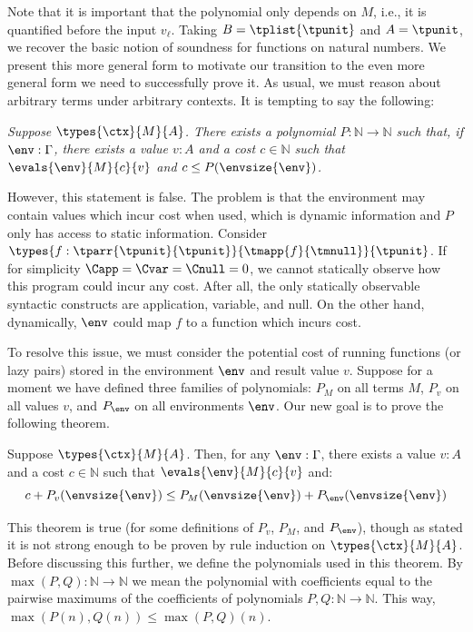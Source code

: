 Note that it is important that the polynomial only depends on $M$, i.e., it is quantified before the input $v_\ell$. Taking $B = \tplist{\tpunit}$ and $A = \tpunit$, we recover the basic notion of soundness for \lfplplus functions on natural numbers. We present this more general form to motivate our transition to the even more general form we need to successfully prove it. As usual, we must reason about arbitrary terms under arbitrary contexts. It is tempting to say the following:
\begin{center}
\parbox{.9\linewidth}{
  \it
Suppose $\types{\ctx}{M}{A}$. There exists a polynomial $P : \mathbb N \to \mathbb N$ such that, if $\env : \Gamma$, there exists a value $v : A$ and a cost $c \in \mathbb N$ such that $\evals{\env}{M}{c}{v}$ and $c \le P(\envsize{\env})$.
}
\end{center}
However, this statement is false. The problem is that the environment may contain values which incur cost when used, which is dynamic information and $P$ only has access to static information. Consider $\types{f : \tparr{\tpunit}{\tpunit}}{\tmapp{f}{\tmnull}}{\tpunit}$. If for simplicity $\Capp = \Cvar = \Cnull = 0$, we cannot statically observe how this program could incur any cost. After all, the only statically observable syntactic constructs are application, variable, and null. On the other hand, dynamically, $\env$ could map $f$ to a function which incurs cost.

To resolve this issue, we must consider the potential cost of running functions (or lazy pairs) stored in the environment $\env$ and result value $v$. Suppose for a moment we have defined three families of polynomials: $P_M$ on all terms $M$, $P_v$ on all values $v$, and $P_\env$ on all environments $\env$. Our new goal is to prove the following theorem.

\begin{theorem}
\label{thm:soundness-general}
Suppose $\types{\ctx}{M}{A}$. Then, for any $\env : \Gamma$, there exists a value $v : A$ and a cost $c \in \mathbb N$ such that $\evals{\env}{M}{c}{v}$ and:
\[ c + P_v(\envsize{\env}) \le P_M(\envsize{\env}) + P_{\env}(\envsize{\env}) \]
\end{theorem}

This theorem is true (for some definitions of $P_v$, $P_M$, and $P_\env$), though as stated it is not strong enough to be proven by rule induction on $\types{\ctx}{M}{A}$. Before discussing this further, we define the polynomials used in this theorem. By $\max(P,Q) : \mathbb N \to \mathbb N$ we mean the polynomial with coefficients equal to the pairwise maximums of the coefficients of polynomials $P,Q : \mathbb N \to \mathbb N$. This way, $\max(P(n), Q(n)) \le \max(P,Q)(n)$.

